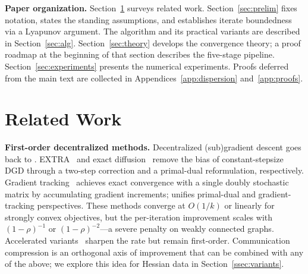 \documentclass[10pt,twocolumn,letterpaper]{article}
\def\cO{O}%
\theoremstyle{compact}
\theoremstyle{compactremark}
\newcommand{\cO}{\mathcal{O}}
\begin{document}
\vspace{1pt}
\noindent\textbf{Paper organization.}
Section~\ref{sec:related} surveys related work.
Section~\ref{sec:prelim} fixes notation, states the standing
assumptions, and establishes iterate boundedness via a Lyapunov
argument.
The algorithm and its practical variants are described in
Section~\ref{sec:alg}.
Section~\ref{sec:theory} develops the convergence theory; a proof
roadmap at the beginning of that section describes the five-stage
pipeline.
Section~\ref{sec:experiments} presents the numerical experiments.
Proofs deferred from the main text are collected in
Appendices~\ref{app:dispersion} and~\ref{app:proofs}.

	\section{Related Work}\label{sec:related}
	
	\noindent\textbf{First-order decentralized methods.}
	Decentralized (sub)gradient descent goes back to
	\citet{nedic2009subgradient}.
	EXTRA~\citep{shi2015extra} and exact
	diffusion~\citep{yuan2019exactdiffusion} remove the bias of
	constant-stepsize DGD through a two-step correction and a
	primal-dual reformulation, respectively.
	Gradient tracking~\citep{nedic2017diging,xin2019distributed,pu2021distributed}
	achieves exact convergence with a single doubly stochastic matrix by
	accumulating gradient increments;
	\citet{alghunaim2020decentralized} unifies primal-dual and
	gradient-tracking perspectives.
	These methods converge at $\cO(1/k)$ or linearly for strongly
	convex objectives, but the per-iteration improvement scales
	with $(1{-}\rho)^{-1}$ or $(1{-}\rho)^{-2}$---a severe
	penalty on weakly connected graphs.
	Accelerated variants~\citep{jakovetic2014fast,li2021decentralized}
	sharpen the rate but remain first-order.
	Communication compression
	\citep{koloskova2019decentralized,beznosikov2023biased}
	is an orthogonal axis of improvement that can be combined with
	any of the above; we explore this idea for Hessian data in
	Section~\ref{ssec:variants}.
	
\end{document}
